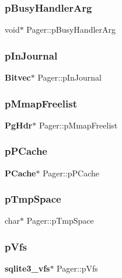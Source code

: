 \subsubsection{pBusyHandlerArg}
{\footnotesize\ttfamily void$\ast$ Pager\+::p\+Busy\+Handler\+Arg}

\mbox{\label{struct_pager_a530ea868337a7c0c4e7c125035f73737}} 
\subsubsection{pInJournal}
{\footnotesize\ttfamily \textbf{ Bitvec}$\ast$ Pager\+::p\+In\+Journal}

\mbox{\label{struct_pager_a2213dad45ad7c79cf50dcdaf9bf6a718}} 
\subsubsection{pMmapFreelist}
{\footnotesize\ttfamily \textbf{ Pg\+Hdr}$\ast$ Pager\+::p\+Mmap\+Freelist}

\mbox{\label{struct_pager_ae2495e45e354e92a858144386f91cab3}} 
\subsubsection{pPCache}
{\footnotesize\ttfamily \textbf{ P\+Cache}$\ast$ Pager\+::p\+P\+Cache}

\mbox{\label{struct_pager_a64934188c72599e0be9ae54d3fc1cc92}} 
\subsubsection{pTmpSpace}
{\footnotesize\ttfamily char$\ast$ Pager\+::p\+Tmp\+Space}

\mbox{\label{struct_pager_affa78e08a7f691a4c8f7043e0b4c9212}} 
\subsubsection{pVfs}
{\footnotesize\ttfamily \textbf{ sqlite3\+\_\+vfs}$\ast$ Pager\+::p\+Vfs}

\mbox{\label{struct_pager_a2c759424108248d8b08e6f400fab14dd}} 
